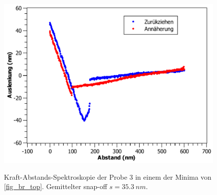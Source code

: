 \documentclass[
	a4paper,
	12pt,
	pagesize,
	ngerman
]{scrartcl}
\begin{document}
\begin{figure}[H]
{			\label{fig_br_ds5}}{\includegraphics[width=.49\linewidth]{images/BR/DS5}}
			\caption{Kraft-Abstands-Spektroskopie der Probe 3 in einem der Minima von \cref{fig_br_top}. Gemittelter snap-off $s=\SI{35.3}{nm}$.} %
			\label{fig_br_ds}
\end{figure}
\end{document}
